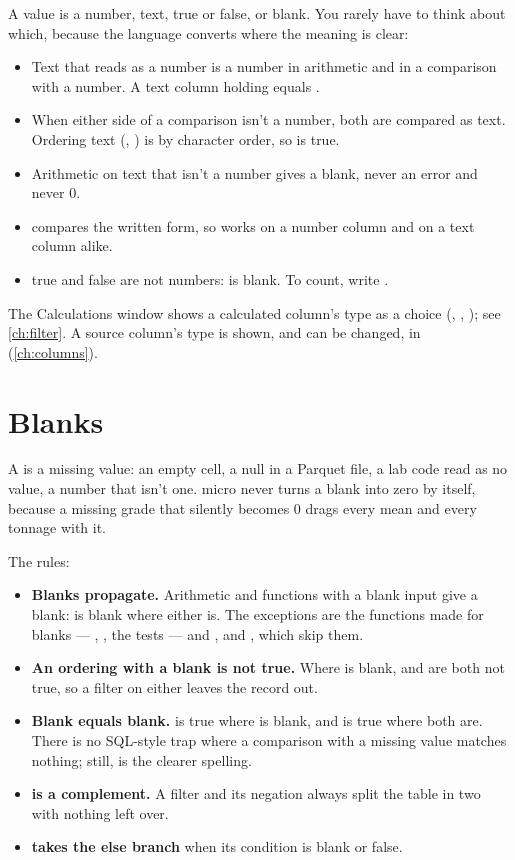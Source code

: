 A value is a number, text, true or false, or blank. You rarely have to think about which, because
the language converts where the meaning is clear:

\begin{itemize}
\item Text that reads as a number is a number in arithmetic and in a comparison with a number. A
  text column holding  equals .
\item When either side of a comparison isn't a number, both are compared as text. Ordering text
  (\code{<}, \code{>}) is by character order, so  is true.
\item Arithmetic on text that isn't a number gives a blank, never an error and never 0.
\item {} compares the written form, so  works on a number
  column and on a text column alike.
\item true and false are not numbers:  is blank. To count, write
  .
\end{itemize}

The Calculations window shows a calculated column's type as a choice (, ,
); see \cref{ch:filter}. A source column's type is shown,
and can be changed, in  (\cref{ch:columns}).

\section{Blanks}\label{sec:expr-blanks}

A  is a missing value: an empty cell, a null in a Parquet file, a lab code read as no
value, a number that isn't one. micro never turns a blank into zero by itself, because a missing
grade that silently becomes 0 drags every mean and every tonnage with it.

The rules:

\begin{itemize}
\item \textbf{Blanks propagate.} Arithmetic and functions with a blank input give a blank:
   is blank where either is. The exceptions are the functions made for blanks —
  , , the tests — and ,  and , which
  skip them.
\item \textbf{An ordering with a blank is not true.} Where  is blank,  and
   are both not true, so a filter on either leaves the record out.
\item \textbf{Blank equals blank.}  is true where  is blank, and
   is true where both are. There is no SQL-style trap where a comparison with a
  missing value matches nothing; still,  is the clearer spelling.
\item \textbf{ is a complement.} A filter and its negation always split the table in two
  with nothing left over.
\item \textbf{ takes the else branch} when its condition is blank or false.
\end{itemize}

